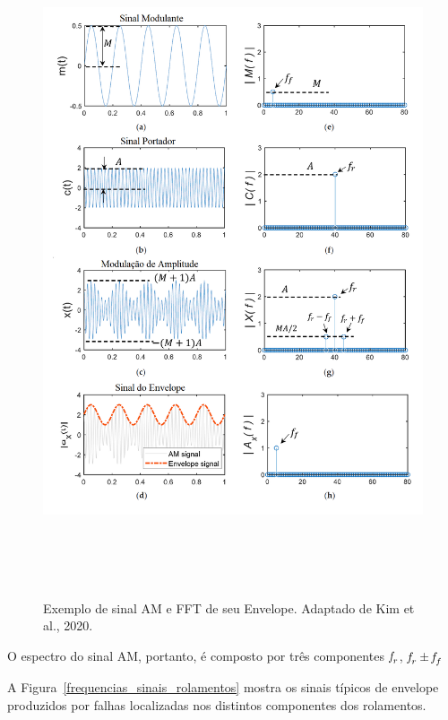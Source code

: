\documentclass[
	12pt,				
	oneside,			
	a4paper,			
	english,			
	brazil,			
	]{abntex2ppgsi}
\newcommand{\f}{\mkern-2mu f\mkern-3mu}
\begin{document}
\begin{figure}[!htb]
\centering
\caption {Exemplo de sinal AM e FFT de seu Envelope. Adaptado de Kim et al., 2020.}
\includegraphics[width=\textwidth,height=190mm,keepaspectratio]{exemplo_AM_FFT}
\label{exemplo_AM_FFT}
\end{figure}

O espectro do sinal AM, portanto, é composto por três componentes ${\f}_r$, ${\f}_r \pm {\f}_f$ 

A Figura~\ref{frequencias_sinais_rolamentos} mostra os sinais típicos de envelope produzidos por falhas localizadas nos distintos componentes dos rolamentos. 
\end{document}
